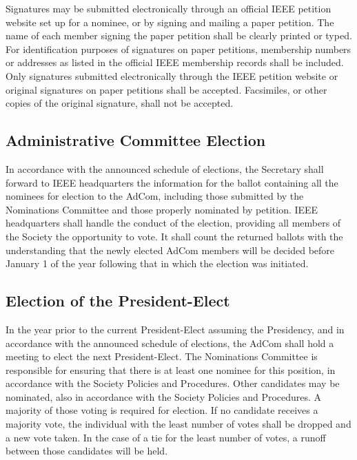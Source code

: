 \documentclass[10pt]{article}
\begin{document}
Signatures may be submitted electronically through an official IEEE petition website set up for a nominee, or by signing and mailing a paper petition.  The name of each member signing the paper petition shall be clearly printed or typed. For identification purposes of signatures on paper petitions, membership numbers or addresses as listed in the official IEEE membership records shall be included.  Only signatures submitted electronically through the IEEE petition website or original signatures on paper petitions shall be accepted.  Facsimiles, or other copies of the original signature, shall not be accepted.



\subsection{Administrative Committee Election}

In accordance with the announced schedule of elections, the Secretary shall forward to IEEE headquarters the information for the ballot containing all the nominees for election to the AdCom, including those submitted by the Nominations Committee and those properly nominated by petition.  IEEE headquarters shall handle the conduct of the election, providing all members of the Society the opportunity to vote.  It shall count the returned ballots with the understanding that the newly elected AdCom members will be decided before January 1 of the year following that in which the election was initiated.

\subsection{Election of the President-Elect}

In the year prior to the current President-Elect assuming the Presidency, and in accordance with the announced schedule of elections, the AdCom shall hold a meeting to elect the next President-Elect.  The Nominations Committee is responsible for ensuring that there is at least one nominee for this position, in accordance with the Society Policies and Procedures. Other candidates may be nominated, also in accordance with the Society Policies and Procedures. A majority of those voting is required for election.  If no candidate receives a majority vote, the individual with the least number of votes shall be dropped and a new vote taken. In the case of a tie for the least number of votes, a runoff between those candidates will be held. 
\end{document}
